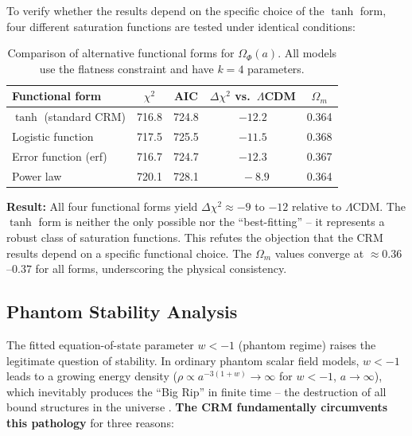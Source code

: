 \documentclass[aps,prd,twocolumn,superscriptaddress,nofootinbib]{revtex4-2}
\begin{document}
To verify whether the results depend on the specific choice of the $\tanh$ form, four different saturation functions are tested under identical conditions:

\begin{table}[htbp]
\centering
\caption{Comparison of alternative functional forms for $\Omega_\Phi(a)$. All models use the flatness constraint and have $k=4$ parameters.}
\label{tab:funcforms}
\begin{tabular}{lcccc}
\toprule
\textbf{Functional form} & $\chi^2$ & AIC & $\Delta\chi^2$ vs.\ $\Lambda$CDM & $\Omega_m$ \\
\midrule
$\tanh$ (standard CRM) & 716.8 & 724.8 & $-12.2$ & 0.364 \\
Logistic function & 717.5 & 725.5 & $-11.5$ & 0.368 \\
Error function (erf) & 716.7 & 724.7 & $-12.3$ & 0.367 \\
Power law & 720.1 & 728.1 & $\phantom{0}-8.9$ & 0.364 \\
\bottomrule
\end{tabular}
\end{table}

\textbf{Result:} All four functional forms yield $\Delta\chi^2 \approx -9$ to $-12$ relative to $\Lambda$CDM. The $\tanh$ form is neither the only possible nor the ``best-fitting'' -- it represents a robust class of saturation functions. This refutes the objection that the CRM results depend on a specific functional choice. The $\Omega_m$ values converge at $\approx 0.36$--$0.37$ for all forms, underscoring the physical consistency.


\subsection{Phantom Stability Analysis}
\label{subsec:phantom}

The fitted equation-of-state parameter $w < -1$ (phantom regime) raises the legitimate question of stability. In ordinary phantom scalar field models, $w < -1$ leads to a growing energy density ($\rho \propto a^{-3(1+w)} \to \infty$ for $w < -1$, $a \to \infty$), which inevitably produces the ``Big Rip'' in finite time -- the destruction of all bound structures in the universe \cite{Caldwell1998}. \textbf{The CRM fundamentally circumvents this pathology} for three reasons:
\end{document}
